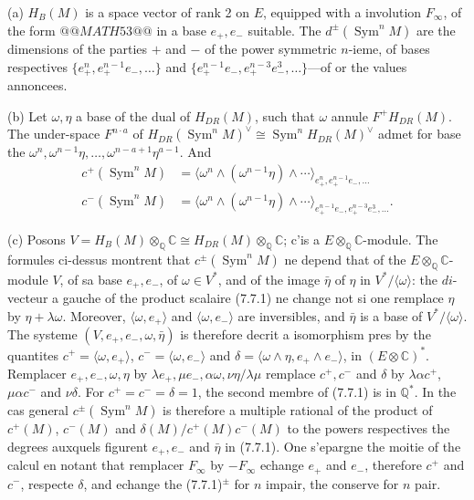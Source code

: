 \documentclass[12pt,a4paper]{article}
\theoremstyle{plain}
\theoremstyle{definition}
\theoremstyle{remark}
\DeclareMathOperator{\Sym}{Sym}
\newcommand{\Q}{\mathbb{Q}}
\newcommand{\C}{\mathbb{C}}
\begin{document}
(a) $H_B(M)$ is a space vector of rank 2 on $E$, equipped with a involution $F_\infty$,
of the form $@@MATH53@@$ in a base $e_+, e_-$ suitable. The
$d^\pm(\Sym^n M)$ are the dimensions of the parties $+$ and $-$ of the power symmetric
$n$-ieme, of bases respectives
$\{e_+^n, e_+^{n-1}e_-, \ldots\}$ and $\{e_+^{n-1}e_-, e_+^{n-3}e_-^3, \ldots\}$---of or the values annoncees.

(b) Let $\omega, \eta$ a base of the dual of $H_{DR}(M)$, such that $\omega$ annule $F^+ H_{DR}(M)$. The
under-space $F^{n \cdot a}$ of $H_{DR}(\Sym^n M)^\vee \cong \Sym^n H_{DR}(M)^\vee$ admet for base
the $\omega^n, \omega^{n-1}\eta, \ldots, \omega^{n-a+1}\eta^{a-1}$. And
\begin{align*}
c^+(\Sym^n M) &= \langle \omega^n \wedge (\omega^{n-1}\eta) \wedge \cdots \rangle_{e_+^n, e_+^{n-1}e_-, \ldots} \\
c^-(\Sym^n M) &= \langle \omega^n \wedge (\omega^{n-1}\eta) \wedge \cdots \rangle_{e_+^{n-1}e_-, e_+^{n-3}e_-^3, \ldots}. \tag{7.7.1} \label{eq:7.7.1}
\end{align*}

(c) Posons $V = H_B(M) \otimes_\Q \C \cong H_{DR}(M) \otimes_\Q \C$; c'is a
$E \otimes_\Q \C$-module. The formules ci-dessus montrent that $c^\pm(\Sym^n M)$ ne
depend that of the $E \otimes_\Q \C$-module $V$, of sa base $e_+, e_-$, of $\omega \in V^*$, and of
the image $\bar{\eta}$ of $\eta$ in $V^*/\langle \omega \rangle$: the $di$-vecteur a gauche of the product
scalaire (7.7.1) ne change not si one remplace $\eta$ by $\eta + \lambda\omega$. Moreover,
$\langle \omega, e_+ \rangle$ and $\langle \omega, e_- \rangle$ are inversibles, and $\bar{\eta}$ is a base of
$V^*/\langle \omega \rangle$. The systeme $(V, e_+, e_-, \omega, \bar{\eta})$ is therefore decrit a isomorphism pres
by the quantites $c^+ = \langle \omega, e_+ \rangle$, $c^- = \langle \omega, e_- \rangle$ and
$\delta = \langle \omega \wedge \eta, e_+ \wedge e_- \rangle$, in $(E \otimes \C)^*$. Remplacer $e_+, e_-,
\omega, \eta$ by $\lambda e_+, \mu e_-, \alpha \omega, \nu \eta/\lambda\mu$ remplace $c^+, c^-$ and $\delta$ by
$\lambda\alpha c^+$, $\mu\alpha c^-$ and $\nu\delta$. For $c^+ = c^- = \delta = 1$, the second membre of
(7.7.1) is in $\Q^*$. In the cas general $c^\pm(\Sym^n M)$ is therefore a multiple
rational of the product of $c^+(M)$, $c^-(M)$ and $\delta(M)/c^+(M)c^-(M)$ to the powers
respectives the degrees auxquels figurent $e_+, e_-$ and $\bar{\eta}$ in (7.7.1). One s'epargne
the moitie of the calcul en notant that remplacer $F_\infty$ by $-F_\infty$ echange $e_+$ and
$e_-$, therefore $c^+$ and $c^-$, respecte $\delta$, and echange the (7.7.1)$^\pm$ for $n$
impair, the conserve for $n$ pair.
\end{document}
